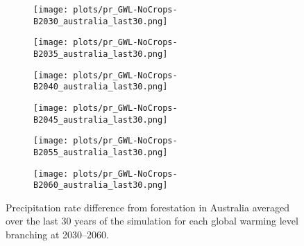 \documentclass[]{article}
\begin{document}
\begin{figure}[H]
    \centering
    \begin{subfigure}[b]{0.4\linewidth}
        \texttt{[image: plots/pr\_GWL-NoCrops-B2030\_australia\_last30.png]}
    \end{subfigure}
    \begin{subfigure}[b]{0.4\linewidth}
        \texttt{[image: plots/pr\_GWL-NoCrops-B2035\_australia\_last30.png]}
    \end{subfigure}
    \begin{subfigure}[b]{0.4\linewidth}
        \texttt{[image: plots/pr\_GWL-NoCrops-B2040\_australia\_last30.png]}
    \end{subfigure}
    \begin{subfigure}[b]{0.4\linewidth}
        \texttt{[image: plots/pr\_GWL-NoCrops-B2045\_australia\_last30.png]}
    \end{subfigure}
    \begin{subfigure}[b]{0.4\linewidth}
        \texttt{[image: plots/pr\_GWL-NoCrops-B2055\_australia\_last30.png]}
    \end{subfigure}
    \begin{subfigure}[b]{0.4\linewidth}
        \texttt{[image: plots/pr\_GWL-NoCrops-B2060\_australia\_last30.png]}
    \end{subfigure}
    \caption{Precipitation rate difference from forestation in Australia averaged over the last 30 years of the simulation for each global warming level branching at 2030--2060.}
    \label{fig:pr_australia}
\end{figure}
\end{document}
